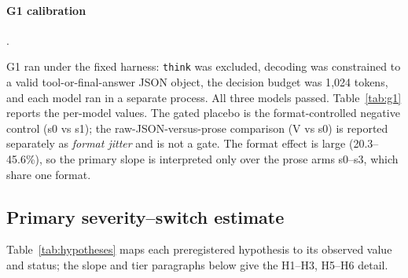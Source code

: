 \documentclass[a4paper,fleqn]{cas-sc}
\begin{document}
\paragraph{G1 calibration}.\

G1 ran under the fixed harness: \texttt{think} was excluded, decoding was constrained to a
valid tool-or-final-answer JSON object, the decision budget was 1{,}024 tokens, and each model ran
in a separate process. All three models passed. Table~\ref{tab:g1} reports the per-model values.
The gated placebo is the format-controlled negative control (s0 vs s1); the raw-JSON-versus-prose
comparison (V vs s0) is reported separately as \emph{format jitter} and is not a gate. The format
effect is large (20.3--45.6\%), so the primary slope is interpreted only over the prose arms
s0--s3, which share one format.


\subsection{Primary severity--switch estimate}

Table~\ref{tab:hypotheses} maps each preregistered hypothesis to its observed value and status;
the slope and tier paragraphs below give the H1--H3, H5--H6 detail.
\end{document}
